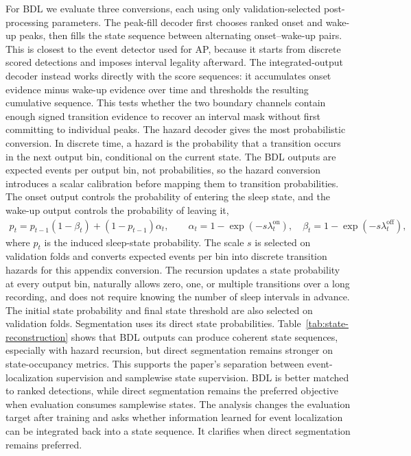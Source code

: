 For BDL we evaluate three conversions, each using only validation-selected post-processing parameters.
The peak-fill decoder first chooses ranked onset and wake-up peaks, then fills the state sequence between alternating onset--wake-up pairs.
This is closest to the event detector used for AP, because it starts from discrete scored detections and imposes interval legality afterward.
The integrated-output decoder instead works directly with the score sequences: it accumulates onset evidence minus wake-up evidence over time and thresholds the resulting cumulative sequence.
This tests whether the two boundary channels contain enough signed transition evidence to recover an interval mask without first committing to individual peaks.
The hazard decoder gives the most probabilistic conversion.
In discrete time, a hazard is the probability that a transition occurs in the next output bin, conditional on the current state.
The BDL outputs are expected events per output bin, not probabilities, so the hazard conversion introduces a scalar calibration before mapping them to transition probabilities.
The onset output controls the probability of entering the sleep state, and the wake-up output controls the probability of leaving it,
\begin{align}
    p_t = p_{t-1}(1-\beta_t) + (1-p_{t-1})\alpha_t,
    \qquad
    \alpha_t = 1-\exp(-s\lambda^{\mathrm{on}}_t),
    \quad
    \beta_t = 1-\exp(-s\lambda^{\mathrm{off}}_t),
\end{align}
where $p_t$ is the induced sleep-state probability.
The scale $s$ is selected on validation folds and converts expected events per bin into discrete transition hazards for this appendix conversion.
The recursion updates a state probability at every output bin, naturally allows zero, one, or multiple transitions over a long recording, and does not require knowing the number of sleep intervals in advance.
The initial state probability and final state threshold are also selected on validation folds.
Segmentation uses its direct state probabilities.
Table~\ref{tab:state-reconstruction} shows that BDL outputs can produce coherent state sequences, especially with hazard recursion, but direct segmentation remains stronger on state-occupancy metrics.
This supports the paper's separation between event-localization supervision and samplewise state supervision.
BDL is better matched to ranked detections, while direct segmentation remains the preferred objective when evaluation consumes samplewise states.
The analysis changes the evaluation target after training and asks whether information learned for event localization can be integrated back into a state sequence.
It clarifies when direct segmentation remains preferred.

